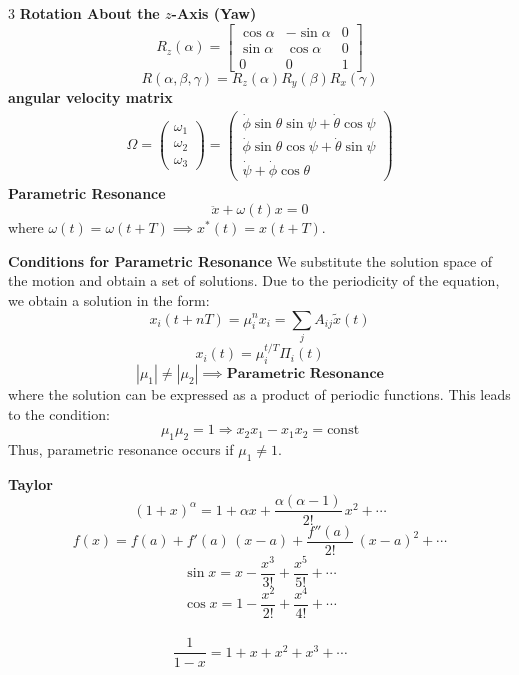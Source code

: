 \documentclass[1pt]{article}
\begin{document}
\begin{multicols}{3}
\textbf{Rotation About the $z$-Axis (Yaw)}
\begin{equation*}
R_z(\alpha) =
\begin{bmatrix}
\cos\alpha & -\sin\alpha & 0 \\
\sin\alpha & \cos\alpha & 0 \\
0 & 0 & 1
\end{bmatrix}
\end{equation*}
\[R(\alpha, \beta, \gamma) = R_z(\alpha) R_y(\beta) R_x(\gamma)
\]
\textbf{angular velocity matrix}
\begin{align*}
\Omega=
    \begin{pmatrix} \omega_1 \\ \omega_2 \\ \omega_3 \end{pmatrix}
=
\begin{pmatrix} 
\dot{\phi} \sin\theta \sin\psi + \dot{\theta} \cos\psi \\ 
\dot{\phi} \sin\theta \cos\psi + \dot{\theta} \sin\psi \\ 
\dot{\psi} + \dot{\phi} \cos\theta 
\end{pmatrix}
\end{align*}
\textbf{Parametric Resonance}
\[
\ddot{x} + \omega (t) x = 0
\]
where $\omega (t)=\omega (t+T)\implies x^*(t)=x(t+T)$.

\textbf{Conditions for Parametric Resonance}
We substitute the solution space of the motion and obtain a set of solutions. Due to the periodicity of the equation, we obtain a solution in the form:
\[
x_i (t + nT) = \mu_i^n x_i=\sum_j A_{ij}\tilde{x}(t)
\]
\[x_i(t)=\mu_i^{t/T}\Pi_i(t)    \]
\[\left|\mu_{1}\right|\neq\left|\mu_{2}\right|\implies\textbf{Parametric Resonance}\]
where the solution can be expressed as a product of periodic functions. This leads to the condition:
\[
\mu_1 \mu_2 = 1 \Rightarrow x_2 x_1 - x_1 x_2 = \text{const}
\]
Thus, parametric resonance occurs if $\mu_1 \neq 1$.

\textbf{Taylor}
\[
(1 + x)^\alpha
 = 1
 + \alpha x
 + \frac{\alpha(\alpha-1)}{2!}\,x^2
 + \cdots
\]
\[
f(x) = f(a)
  + f'(a)\,(x - a)
  + \frac{f''(a)}{2!}\,(x - a)^2
   + \cdots
\]
\[
\sin x
 = x
 - \frac{x^3}{3!}
 + \frac{x^5}{5!}+\cdots
\]
\[
\cos x
 = 1
 - \frac{x^2}{2!}
 + \frac{x^4}{4!}
 + \cdots\]\
\[
\frac{1}{1 - x}
 = 1
 + x
 + x^2
 + x^3+ \cdots
\]


\end{multicols}
\end{document}
